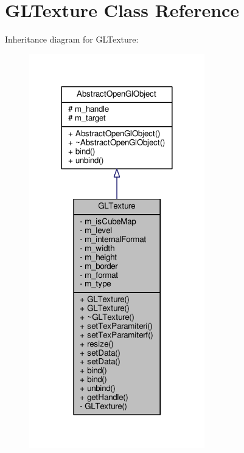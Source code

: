 \hypertarget{class_g_l_texture}{\section{G\-L\-Texture Class Reference}
\label{class_g_l_texture}
}


Inheritance diagram for G\-L\-Texture\-:\nopagebreak
\begin{figure}[H]
\begin{center}
\leavevmode
\includegraphics[width=216pt]{class_g_l_texture__inherit__graph}
\end{center}
\end{figure}


